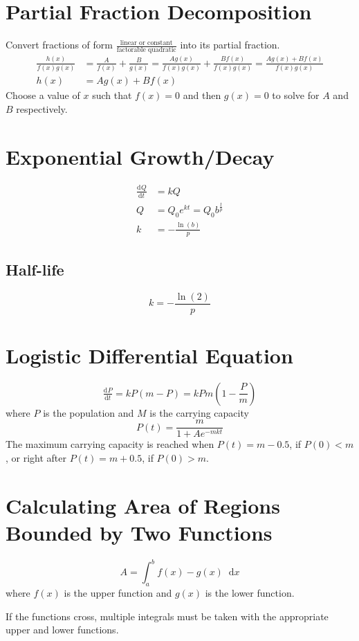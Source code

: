 \documentclass[12pt]{article}
\newcommand*{\dd}[3][]{\tfrac{\mathrm{d}^{#1}#2}{\mathrm{d}#3^{#1}}}
\newcommand*{\D}[1]{\mathop{}\!\mathrm{d} #1}
\newenvironment{rmbskip}{\setlength{\belowdisplayskip}{0pt}\ignorespaces}%
  {\ignorespacesafterend}
\newenvironment{rmskip}{\setlength{\abovedisplayskip}{0pt}%
  \setlength{\belowdisplayskip}{0pt}\ignorespaces}%
  {\ignorespacesafterend}
\begin{document}
\section*{Partial Fraction Decomposition}
Convert fractions of form \(\frac{\text{linear or constant}}{\text{factorable
quadratic}}\) into its partial fraction.
\begin{align*}
  \frac{h(x)}{f(x)g(x)} &= \frac{A}{f(x)} + \frac{B}{g(x)} = \frac{Ag(x)}
  {f(x)g(x)} + \frac{Bf(x)}{f(x)g(x)} = \frac{Ag(x) + Bf(x)}{f(x)g(x)}\\
  h(x) &= Ag(x) + Bf(x)
\end{align*}
Choose a value of \(x\) such that \(f(x) = 0\) and then \(g(x) = 0\) to solve
for \(A\) and \(B\) respectively.
\section*{Exponential Growth\slash Decay}
\begin{rmskip}
  \begin{align*}
    \dd{Q}{t} &= kQ\\
    Q &= Q_0 e^{kt} = Q_0 b^{\frac{t}{p}}\\
    k &= -\frac{\ln(b)}{p}
  \end{align*}
\end{rmskip}
\subsection*{Half-life}
\begin{rmbskip}
  \[
    k = -\frac{\ln(2)}{p}
  \]
\end{rmbskip}
\section*{Logistic Differential Equation}
\[
  \dd{P}{t} = kP(m - P) = kPm\left(1-\frac{P}{m}\right)
\]
where \(P\) is the population and \(M\) is the carrying capacity
\[
  P(t) = \frac{m}{1 + Ae^{-mkt}}
\]
The maximum carrying capacity is reached when \(P(t) = m - 0.5\), if \(P(0) <
m\), or right after \(P(t) = m + 0.5\), if \(P(0) > m\).
\section*{Calculating Area of Regions Bounded by Two Functions}
\[
  A = \int_a^b f(x) - g(x) \D{x}
\]
where \(f(x)\) is the upper function and \(g(x)\) is the lower function.

If the functions cross, multiple integrals must be taken with the appropriate
upper and lower functions.
\end{document}
